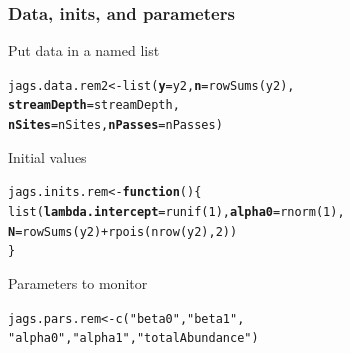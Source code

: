 \documentclass[color=usenames,dvipsnames]{beamer}\usepackage[]{graphicx}\usepackage[]{color}
\makeatletter
\newcommand{\hlnum}[1]{\textcolor[rgb]{0.69,0.494,0}{#1}}%
\newcommand{\hlstr}[1]{\textcolor[rgb]{0.749,0.012,0.012}{#1}}%
\newcommand{\hlopt}[1]{\textcolor[rgb]{0,0,0}{#1}}%
\newcommand{\hlstd}[1]{\textcolor[rgb]{0,0,0}{#1}}%
\newcommand{\hlkwa}[1]{\textcolor[rgb]{0,0,0}{\textbf{#1}}}%
\newcommand{\hlkwb}[1]{\textcolor[rgb]{0,0.341,0.682}{#1}}%
\newcommand{\hlkwc}[1]{\textcolor[rgb]{0,0,0}{\textbf{#1}}}%
\newcommand{\hlkwd}[1]{\textcolor[rgb]{0.004,0.004,0.506}{#1}}%
\newenvironment{kframe}{%
 \def\at@end@of@kframe{}%
 \ifinner\ifhmode%
  \def\at@end@of@kframe{\end{minipage}}%
  \begin{minipage}{\columnwidth}%
 \fi\fi%
 \def\FrameCommand##1{\hskip\@totalleftmargin \hskip-\fboxsep
 \colorbox{shadecolor}{##1}\hskip-\fboxsep
     \hskip-\linewidth \hskip-\@totalleftmargin \hskip\columnwidth}%
 \MakeFramed {\advance\hsize-\width
   \@totalleftmargin\z@ \linewidth\hsize
   \@setminipage}}%
 {\par\unskip\endMakeFramed%
 \at@end@of@kframe}
\newenvironment{knitrout}{}{} %
\makeatother
\begin{document}
\begin{frame}[fragile]
  \frametitle{Data, inits, and parameters}
  Put data in a named list
  \vspace{-12pt}
\begin{knitrout}\small
{}\color{fgcolor}\begin{kframe}
\begin{alltt}
\hlstd{jags.data.rem2} \hlkwb{<-} \hlkwd{list}\hlstd{(}\hlkwc{y}\hlstd{=y2,} \hlkwc{n}\hlstd{=}\hlkwd{rowSums}\hlstd{(y2),}
                       \hlkwc{streamDepth}\hlstd{=streamDepth,}
                       \hlkwc{nSites}\hlstd{=nSites,} \hlkwc{nPasses}\hlstd{=nPasses)}
\end{alltt}
\end{kframe}
\end{knitrout}
\pause
\vfill
  Initial values
  \vspace{-12pt}
\begin{knitrout}\small
{}\color{fgcolor}\begin{kframe}
\begin{alltt}
\hlstd{jags.inits.rem} \hlkwb{<-} \hlkwa{function}\hlstd{() \{}
    \hlkwd{list}\hlstd{(}\hlkwc{lambda.intercept}\hlstd{=}\hlkwd{runif}\hlstd{(}\hlnum{1}\hlstd{),} \hlkwc{alpha0}\hlstd{=}\hlkwd{rnorm}\hlstd{(}\hlnum{1}\hlstd{),}
         \hlkwc{N}\hlstd{=}\hlkwd{rowSums}\hlstd{(y2)}\hlopt{+}\hlkwd{rpois}\hlstd{(}\hlkwd{nrow}\hlstd{(y2),} \hlnum{2}\hlstd{))}
\hlstd{\}}
\end{alltt}
\end{kframe}
\end{knitrout}
\pause
\vfill
  Parameters to monitor
  \vspace{-12pt}
\begin{knitrout}\small
{}\color{fgcolor}\begin{kframe}
\begin{alltt}
\hlstd{jags.pars.rem} \hlkwb{<-} \hlkwd{c}\hlstd{(}\hlstr{"beta0"}\hlstd{,} \hlstr{"beta1"}\hlstd{,}
                   \hlstr{"alpha0"}\hlstd{,} \hlstr{"alpha1"}\hlstd{,} \hlstr{"totalAbundance"}\hlstd{)}
\end{alltt}
\end{kframe}
\end{knitrout}
\end{frame}
\end{document}
